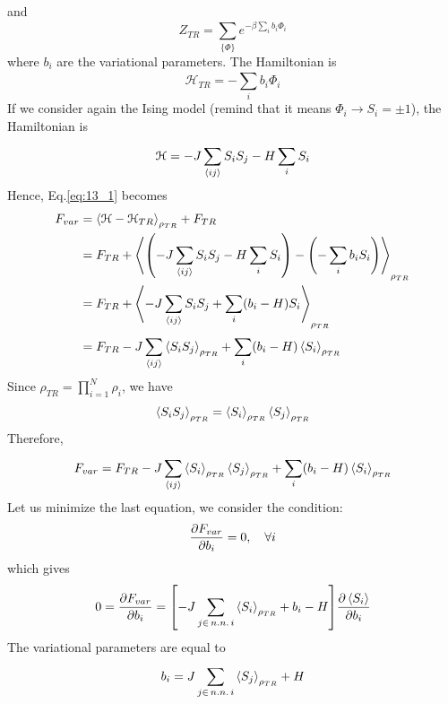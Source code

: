 \documentclass[../main/main.tex]{subfiles}
\begin{document}
and
\begin{equation}
  Z_{TR} = \sum_{\{ \Phi  \}  }^{}  e^{-\beta \sum_{i}^{} b_i \Phi _i  }
\end{equation}
where \( b_i \) are the variational parameters. The Hamiltonian is 
\begin{equation}
  \mathcal{H}_{TR} = - \sum_{i}^{} b_i \Phi _i
\end{equation}
If we consider again the Ising model (remind that it means \(\Phi_i \rightarrow S_i = \pm 1\)), the Hamiltonian is
\begin{equation*}
  \mathcal{H} = - J \sum_{\expval{ij} }^{} S_i S_j - H \sum_{i}^{} S_i
\end{equation*}
Hence, Eq.\eqref{eq:13_1} becomes
\begin{equation*}
\begin{split}
F_{var}  &= \expval{\mathcal{H} - \mathcal{H}_{TR}}_{\rho _{TR}} + F_{TR}   \\
& = F_{TR} + \expval{\qty(- J \sum_{\expval{ij} }^{} S_i S_j - H \sum_{i}^{} S_i    ) - \qty(- \sum_{i}^{} b_i S_i )  }_{\rho _{TR}} \\
& = F_{TR} + \expval{-J \sum_{\expval{ij} }^{} S_i S_j + \sum_{i}^{} (b_i-H) S_i   }_{\rho _{TR}} \\
& = F_{TR} - J \sum_{\expval{ij} }^{} \expval{S_i S_j}_{\rho _{TR}} + \sum_{i}^{} (b_i - H) \expval{S_i}_{\rho _{TR}}
\end{split}
\end{equation*}
Since \( \rho _{TR} = \prod_{i=1}^{N} \rho _i  \), we have 
\begin{equation*}
  \expval{S_i S_j}_{\rho _{TR}}  = \expval{S_i}_{\rho _{TR}}  \expval{S_j}_{\rho _{TR}}
\end{equation*}
Therefore,
\begin{equation*}
  F_{var} = F_{TR} - J \sum_{\expval{ij} }^{} \expval{S_i}_{\rho _{TR}}  \expval{S_j}_{\rho _{TR}}  + \sum_{i}^{} (b_i - H) \expval{S_i}_{\rho _{TR}}
\end{equation*}
Let us minimize the last equation, we consider the condition:
\begin{equation*}
  \pdv{F_{var}}{b_i} = 0, \quad \forall i
\end{equation*}
which gives
\begin{equation*}
  0 = \pdv{F_{var}}{b_i} = \qty[-J \sum_{j \in \, n.n. \, i}^{} \expval{S_i}_{\rho _{TR}}  + b_i - H  ] \pdv{\expval{S_i} }{b_i}
\end{equation*}
The variational parameters are equal to
\begin{equation*}
  b_i = J \sum_{j\in \, n.n. \, i}^{} \expval{S_j}_{\rho _{TR}} + H
\end{equation*}
\end{document}

